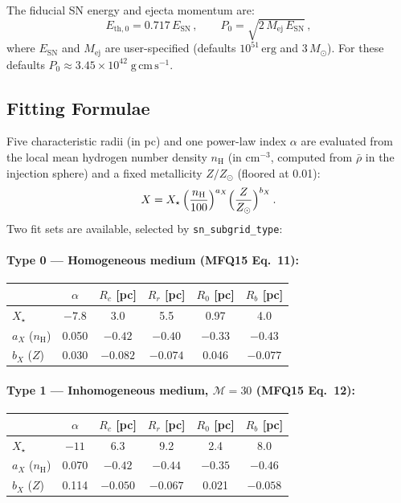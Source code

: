 \documentclass[11pt]{article}
\begin{document}
The fiducial SN energy and ejecta momentum are:
\begin{equation}
  E_\mathrm{th,0} = 0.717\,E_\mathrm{SN}\,,
  \qquad
  P_0 = \sqrt{2\,M_\mathrm{ej}\,E_\mathrm{SN}}\,,
\end{equation}
where $E_\mathrm{SN}$ and $M_\mathrm{ej}$ are user-specified (defaults
$10^{51}\,\mathrm{erg}$ and $3\,M_\odot$).  For these defaults
$P_0 \approx 3.45 \times 10^{42}\;\mathrm{g\,cm\,s^{-1}}$.

\subsection{Fitting Formulae}

Five characteristic radii (in pc) and one power-law index $\alpha$ are
evaluated from the local mean hydrogen number density $n_\mathrm{H}$ (in
$\mathrm{cm}^{-3}$, computed from $\bar{\rho}$ in the injection sphere) and a
fixed metallicity $Z/Z_\odot$ (floored at 0.01):
\begin{equation}
  X = X_\star\,\Bigl(\frac{n_\mathrm{H}}{100}\Bigr)^{a_X}
      \Bigl(\frac{Z}{Z_\odot}\Bigr)^{b_X}\,.
\end{equation}
Two fit sets are available, selected by \texttt{sn\_subgrid\_type}:

\paragraph{Type 0 --- Homogeneous medium (MFQ15 Eq.~11):}
\begin{center}
\begin{tabular}{@{}lccccc@{}}
\toprule
 & $\alpha$ & $R_c$ [pc] & $R_r$ [pc] & $R_0$ [pc] & $R_b$ [pc] \\
\midrule
$X_\star$ & $-7.8$ & 3.0 & 5.5 & 0.97 & 4.0 \\
$a_X$ ($n_\mathrm{H}$) & 0.050 & $-0.42$ & $-0.40$ & $-0.33$ & $-0.43$ \\
$b_X$ ($Z$) & 0.030 & $-0.082$ & $-0.074$ & 0.046 & $-0.077$ \\
\bottomrule
\end{tabular}
\end{center}

\paragraph{Type 1 --- Inhomogeneous medium, $\mathcal{M} = 30$ (MFQ15
Eq.~12):}
\begin{center}
\begin{tabular}{@{}lccccc@{}}
\toprule
 & $\alpha$ & $R_c$ [pc] & $R_r$ [pc] & $R_0$ [pc] & $R_b$ [pc] \\
\midrule
$X_\star$ & $-11$ & 6.3 & 9.2 & 2.4 & 8.0 \\
$a_X$ ($n_\mathrm{H}$) & 0.070 & $-0.42$ & $-0.44$ & $-0.35$ & $-0.46$ \\
$b_X$ ($Z$) & 0.114 & $-0.050$ & $-0.067$ & 0.021 & $-0.058$ \\
\bottomrule
\end{tabular}
\end{center}
\end{document}
